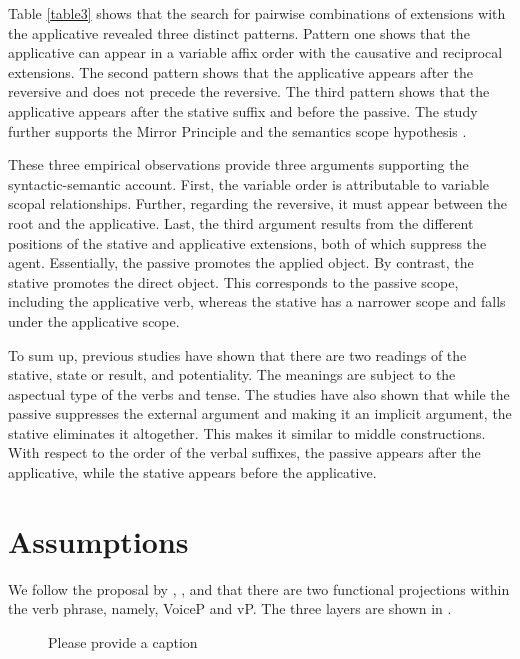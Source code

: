 \documentclass[output=paper]{langscibook}
\begin{document}
Table \ref{table3} shows that the search for pairwise combinations of extensions with the applicative revealed three distinct patterns. Pattern one shows that the applicative can appear in a variable affix order with the causative and reciprocal extensions. The second pattern shows that the applicative appears after the reversive and does not precede the reversive. The third pattern shows  that the applicative appears after the stative suffix and before the passive. The study further supports the Mirror Principle \citep{Baker1985} and the semantics scope hypothesis \citep{rice2000}. 

These three empirical observations provide three arguments supporting the syntactic-semantic account. First, the variable order is attributable to variable scopal relationships. Further, regarding the reversive, it must appear between the root and the applicative. Last, the third argument results from the different positions of the stative and applicative extensions, both of which suppress the agent. Essentially, the passive promotes the applied object. By contrast, the stative promotes the direct object. This corresponds to the passive scope, including the applicative verb, whereas the stative has a narrower scope and falls under the applicative scope. 

To sum up, previous studies have shown that there are two readings of the stative, state or result, and potentiality. The meanings are subject to the aspectual type of the verbs and tense. The studies have also shown that while the passive suppresses the external argument and making it an implicit argument, the stative eliminates it altogether. This makes it similar to middle constructions. With respect to the order of the verbal suffixes, the passive appears after the applicative, while the stative appears before the applicative.  

\section{Assumptions}
We follow the proposal by \citet{Folli:2007aa}, \citet{legate14}, and \citet{pylkkanen08} that there are two functional projections within the verb phrase, namely, VoiceP and vP. The three layers are shown in .

\begin{figure}
\caption{\label{fig:rmtree}\color{red}Please provide a caption}
\end{figure}
\end{document}
